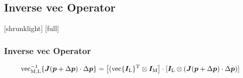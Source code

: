 \subsection{Inverse vec Operator}
[shrunklight]
[full]
\begin{frame}
\frametitle{Inverse vec Operator}
	\begin{equation*}
	\operatorname{vec}^{-1}_{\operatorname{M}, \operatorname{L}} \{ \bm{J} (\bm{p} + \Delta \bm{p})\cdot \Delta \bm{p} \} = \left[ (\operatorname{vec} \{ \bm{I}_{\operatorname{L}} \}^{\operatorname{T}} \otimes \bm{I}_{\operatorname{M}} \right] \cdot \left[ \bm{I}_{\operatorname{L}} \otimes ( \bm{J} (\bm{p} + \Delta \bm{p})\cdot \Delta \bm{p} ) \right]
	\end{equation*}
\end{frame}


